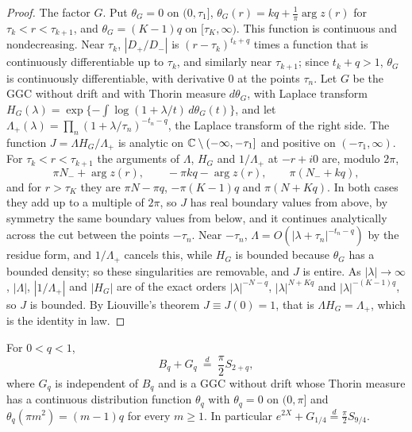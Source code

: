 \begin{proof}
The factor $G$. Put $\theta_G=0$ on $(0,\tau_1]$, $\theta_G(r)=kq+\frac1\pi\arg z(r)$ for $\tau_k<r<\tau_{k+1}$, and $\theta_G=(K-1)q$ on $[\tau_K,\infty)$. This function is continuous and nondecreasing. Near $\tau_k$, $|D_+/D_-|$ is $(r-\tau_k)^{t_k+q}$ times a function that is continuously differentiable up to $\tau_k$, and similarly near $\tau_{k+1}$; since $t_k+q>1$, $\theta_G$ is continuously differentiable, with derivative $0$ at the points $\tau_n$. Let $G$ be the GGC without drift and with Thorin measure $d\theta_G$, with Laplace transform $H_G(\lambda)=\exp\{-\int\log(1+\lambda/t)\,d\theta_G(t)\}$, and let $\Lambda_+(\lambda)=\prod_n(1+\lambda/\tau_n)^{-t_n-q}$, the Laplace transform of the right side. The function $J=\Lambda H_G/\Lambda_+$ is analytic on $\mathbb{C}\setminus(-\infty,-\tau_1]$ and positive on $(-\tau_1,\infty)$. For $\tau_k<r<\tau_{k+1}$ the arguments of $\Lambda$, $H_G$ and $1/\Lambda_+$ at $-r+i0$ are, modulo $2\pi$,
\[
\pi N_-+\arg z(r),\qquad-\pi kq-\arg z(r),\qquad\pi(N_-+kq),
\]
and for $r>\tau_K$ they are $\pi N-\pi q$, $-\pi(K-1)q$ and $\pi(N+Kq)$. In both cases they add up to a multiple of $2\pi$, so $J$ has real boundary values from above, by symmetry the same boundary values from below, and it continues analytically across the cut between the points $-\tau_n$. Near $-\tau_n$, $\Lambda=O(|\lambda+\tau_n|^{-t_n-q})$ by the residue form, and $1/\Lambda_+$ cancels this, while $H_G$ is bounded because $\theta_G$ has a bounded density; so these singularities are removable, and $J$ is entire. As $|\lambda|\to\infty$, $|\Lambda|$, $|1/\Lambda_+|$ and $|H_G|$ are of the exact orders $|\lambda|^{-N-q}$, $|\lambda|^{N+Kq}$ and $|\lambda|^{-(K-1)q}$, so $J$ is bounded. By Liouville's theorem $J\equiv J(0)=1$, that is $\Lambda H_G=\Lambda_+$, which is the identity in law.
\end{proof}

\begin{theorem}\label{fm:thm:factor}
For $0<q<1$,
\[
B_q+G_q\ \overset d=\ \frac\pi2S_{2+q},
\]
where $G_q$ is independent of $B_q$ and is a GGC without drift whose Thorin measure has a continuous distribution function $\theta_q$ with $\theta_q=0$ on $(0,\pi]$ and $\theta_q(\pi m^2)=(m-1)q$ for every $m\ge1$. In particular $e^{2X}+G_{1/4}\overset d=\frac\pi2S_{9/4}$.
\end{theorem}

